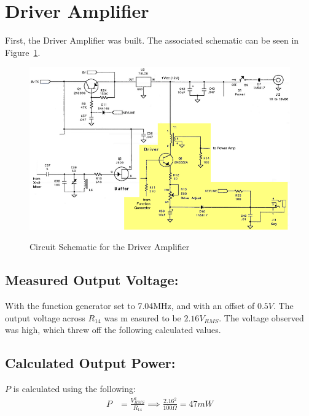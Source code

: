 \section{Driver Amplifier}

First, the Driver Amplifier was built. The associated schematic can be
seen in Figure~\ref{DriverAmp}.

\begin{figure}[h!]
  \centering
  \includegraphics[scale=0.6]{./img/DriverAmp.png}
  \label{DriverAmp}
  \caption{Circuit Schematic for the Driver Amplifier}
\end{figure}

\subsection{Measured Output Voltage: }
With the function generator set to 7.04MHz, and with an offset of 
$0.5V$. The output voltage across $R_{14}$ was m                      easured
to be $\boxed{2.16 V_{RMS}}$. The voltage observed was high, which threw
off the following calculated values.

\subsection{Calculated Output Power: }
  $P$ is calculated using the following:
  \begin{align*}
    P &= \frac{V_{RMS}^2}{R_{14}}
    \implies \frac{2.16^2}{100\Omega}=\boxed{47mW}
  \end{align*}
